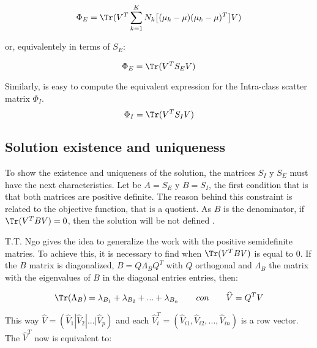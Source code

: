 \begin{equation*} 
\Phi_E =  \Tr (V^T \sum\limits_{k = 1}^{K} N_{k}  \big[(\mu_k - \mu) (\mu_k - \mu)^T \big] V)   
\end{equation*}

or, equivalentely in terms of $S_E$:

\begin{equation}\label{eq:2.19}
\Phi_E =  \Tr (V^T S_E V)     
\end{equation}

Similarly, is easy to compute the equivalent expression for the Intra-class scatter matrix $\Phi_{I}$.
\begin{equation}\label{eq:2.20}
\Phi_{I} =  \Tr (V^T S_I V )
\end{equation}



\subsection{Solution existence and uniqueness}

To show the existence and uniqueness of the solution, the matrices $S_I$ y $S_E$ must have the next characteristics. Let be $A = S_E$ y $B = S_I$, the first condition that is that both matrices are positive definite. The reason behind this constraint is related to the objective function, that is a quotient. As $B$ is the denominator, if $\Tr(V^T B V) = 0$, then the solution will be not defined \cite{ngo2012trace}. 

T.T. Ngo gives the idea to generalize the work with the positive semidefinite matries. To achieve this, it is necessary to find when $\Tr(V^T B V)$ is equal to $0$. If the $B$ matrix is diagonalized, $B = Q \Lambda_{B} Q^T$ with $Q$ orthogonal and $\Lambda_{B}$ the matrix with the eigenvalues of $B$ in the diagonal entries entries, then:

\begin{equation*}
\Tr(\Lambda_{B}) = \lambda_{B_1}+ \lambda_{B_2}+ ... +\lambda_{B_n} \qquad con \qquad \widehat{V} = Q^T V
\end{equation*}

This way $\widehat{V} = (\widehat{V}_1 | \widehat{V}_2 | ... | \widehat{V}_p)$ and each $\widehat{V}_i^T = (\widehat{V}_{i1}, \widehat{V}_{i2}, ..., \widehat{V}_{in})$ is a row vector. The $\widehat{V}^T$ now is equivalent to:

